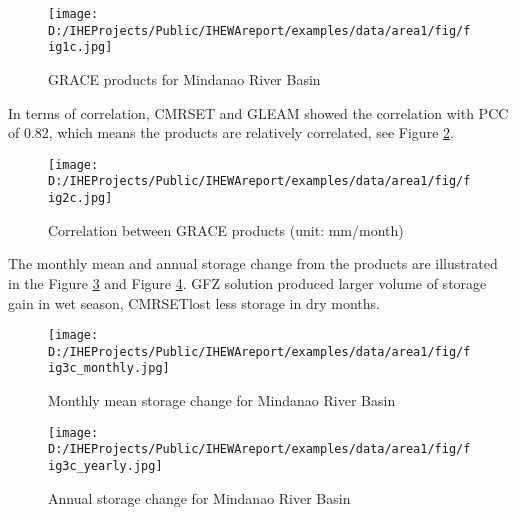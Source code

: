 \documentclass[oneside,openany]{article}%
\begin{document}
\begin{figure}[H]%
\centering%
\texttt{[image: D:/IHEProjects/Public/IHEWAreport/examples/data/area1/fig/fig1c.jpg]}%
\caption{GRACE products for Mindanao River Basin}%
\label{figure:fig11}%
\end{figure}

%
In terms of correlation, CMRSET and GLEAM showed the correlation with PCC of 0.82, which means the products are relatively correlated, see Figure \ref{figure:fig12}.%
\linebreak%


\begin{figure}[H]%
\centering%
\texttt{[image: D:/IHEProjects/Public/IHEWAreport/examples/data/area1/fig/fig2c.jpg]}%
\caption{Correlation between GRACE products (unit: mm/month)}%
\label{figure:fig12}%
\end{figure}

%
The monthly mean and annual storage change from the products are illustrated in the Figure \ref{figure:fig13} and Figure \ref{figure:fig14}. GFZ solution produced larger volume of storage gain in wet season, CMRSETlost less storage in dry months.%
\linebreak%


\begin{figure}[H]%
\centering%
\texttt{[image: D:/IHEProjects/Public/IHEWAreport/examples/data/area1/fig/fig3c\_monthly.jpg]}%
\caption{Monthly mean storage change for Mindanao River Basin}%
\label{figure:fig13}%
\end{figure}

%


\begin{figure}[H]%
\centering%
\texttt{[image: D:/IHEProjects/Public/IHEWAreport/examples/data/area1/fig/fig3c\_yearly.jpg]}%
\caption{Annual storage change  for Mindanao River Basin}%
\label{figure:fig14}%
\end{figure}

%
\end{document}
